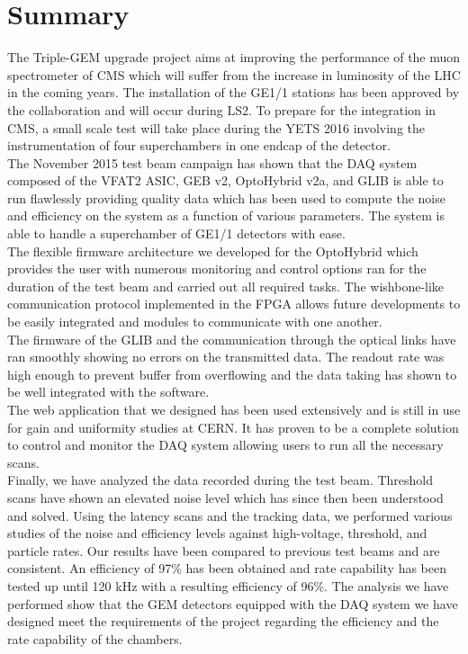 \chapter{Summary}
\label{chap:II-7-summary}

  The Triple-GEM upgrade project aims at improving the performance of the muon spectrometer of CMS which will suffer from the increase in luminosity of the LHC in the coming years. The installation of the GE1/1 stations has been approved by the collaboration and will occur during LS2. To prepare for the integration in CMS, a small scale test will take place during the YETS 2016 involving the instrumentation of four superchambers in one endcap of the detector. \\



The November 2015 test beam campaign has shown that the DAQ system composed of the VFAT2 ASIC, GEB v2, OptoHybrid v2a, and GLIB is able to run flawlessly providing quality data which has been used to compute the noise and efficiency on the system as a function of various parameters. The system is able to handle a superchamber of GE1/1 detectors with ease. \\

The flexible firmware architecture we developed for the OptoHybrid which provides the user with numerous monitoring and control options ran for the duration of the test beam and carried out all required tasks. The wishbone-like communication protocol implemented in the FPGA allows future developments to be easily integrated and modules to communicate with one another. \\

The firmware of the GLIB and the communication through the optical links have ran smoothly showing no errors on the transmitted data. The readout rate was high enough to prevent buffer from overflowing and the data taking has shown to be well integrated with the software. \\

The web application that we designed has been used extensively and is still in use for gain and uniformity studies at CERN. It has proven to be a complete solution to control and monitor the DAQ system allowing users to run all the necessary scans. \\

Finally, we have analyzed the data recorded during the test beam. Threshold scans have shown an elevated noise level which has since then been understood and solved. Using the latency scans and the tracking data, we performed various studies of the noise and efficiency levels against high-voltage, threshold, and particle rates. Our results have been compared to previous test beams and are consistent. An efficiency of 97\% has been obtained and rate capability has been tested up until 120 kHz with a resulting efficiency of 96\%. The analysis we have performed show that the GEM detectors equipped with the DAQ system we have designed meet the requirements of the project regarding the efficiency and the rate capability of the chambers.





